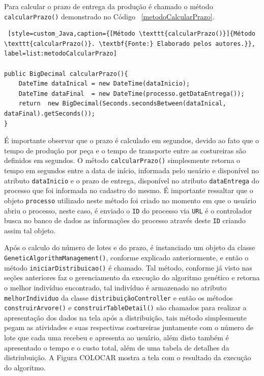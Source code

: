 \par Para calcular o prazo de entrega da produção é chamado o método \texttt{calcularPrazo()} demonstrado no 
Código ~\ref{metodoCalcularPrazo}.

\begin{lstlisting} [style=custom_Java,caption={[Método \texttt{calcularPrazo()}]{Método \texttt{calcularPrazo()}. \textbf{Fonte:} Elaborado pelos autores.}}, label=list:metodoCalcularPrazo] 

public BigDecimal calcularPrazo(){
	DateTime dataInical = new DateTime(dataInicio);
	DateTime dataFinal  = new DateTime(processo.getDataEntrega());
	return  new BigDecimal(Seconds.secondsBetween(dataInical, dataFinal).getSeconds());
}

\end{lstlisting}

\par É importante observar que o prazo é calculado em segundos, devido ao fato que o tempo de produção por peça e o tempo 
de transporte entre as costureiras são definidos em segundos. O método \texttt{calcularPrazo()} simplesmente retorna o tempo 
em segundos entre a data de início, informada pelo usuário e disponível no atributo \texttt{dataInicio} e o prazo de entrega, 
disponível no atributo \texttt{dataEntrega} do processo que foi informada no cadastro do mesmo. É importante ressaltar que
o objeto \texttt{processo} utilizado neste método foi criado no momento em que o usuário abriu o processo, neste caso, é enviado
o \texttt{ID} do processo via \texttt{URL} é o controlador busca no banco de dados as informações do processo através deste \texttt{ID}
criando assim tal objeto.

\par Após o calculo do número de lotes e do prazo, é instanciado um objeto da classe \texttt{GeneticAlgorithmManagement()}, conforme
explicado anteriormente, e então o método \texttt{iniciarDistribuicao()} é chamado. Tal método, conforme já visto nas seções anteriores
faz o gerenciamento da execução do algoritmo genético e retorna o melhor indivíduo encontrado, tal indivíduo é armazenado no 
atributo \texttt{melhorIndividuo} da classe \texttt{distribuiçãoController} e então os métodos \texttt{construirArvore()} e
\texttt{construirTableDetail()} são chamados para realizar a apresentação dos dados na tela após a distribuição, tais método
simplesmente pegam as atividades e suas respectivas costureiras juntamente com o número de lote que cada uma recebeu e 
apresenta ao usuário, além disto também é apresentado o tempo e o custo total, além de uma tabela de detalhes da distriubuição.
A Figura COLOCAR mostra a tela com o resultado da execução do algoritmo.


